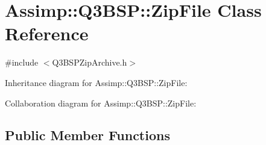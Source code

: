 \hypertarget{class_assimp_1_1_q3_b_s_p_1_1_zip_file}{\section{Assimp\+:\+:Q3\+B\+S\+P\+:\+:Zip\+File Class Reference}
\label{class_assimp_1_1_q3_b_s_p_1_1_zip_file}
}


{\ttfamily \#include $<$Q3\+B\+S\+P\+Zip\+Archive.\+h$>$}



Inheritance diagram for Assimp\+:\+:Q3\+B\+S\+P\+:\+:Zip\+File\+:


Collaboration diagram for Assimp\+:\+:Q3\+B\+S\+P\+:\+:Zip\+File\+:
\subsection*{Public Member Functions}
